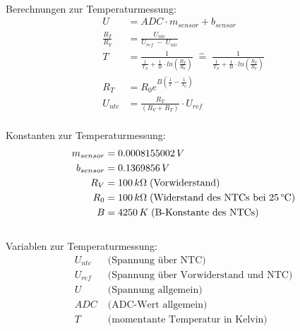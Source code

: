 \\
\begin{center}	
Berechnungen zur Temperaturmessung:
\begin{align}
	U &= ADC \cdot m_{sensor} + b_{sensor} \label{eq: U_ADC_sensor}\\
	\frac{R_T}{R_V} &= \frac{U_{ntc}}{U_{ref}\;-\;U_{ntc}} \label{eq: R_T}\\
	T &= \frac{1}{\frac{1}{T_N}+\frac{1}{B} \cdot ln(\frac{R_T}{R_0})}\; 
	\widehat{=}\; \frac{1}{\frac{1}{T_N}+\frac{1}{B} \cdot ln(\frac{R_T}{R_V})}  \label{eq: T}\\
	R_T &= R_0 e^{B\left(\frac{1}{T} - \frac{1}{T_0}\right)} \label{eq: R_T,2}\\
	U_{ntc} &= \frac{R_T}{(R_V + R_T)} \cdot U_{ref} \label{eq: U_ntc}
\end{align}
\\
Konstanten zur Temperaturmessung:
\begin{align*}
	m_{sensor} &= 0.0008155002\,V\\
	b_{sensor} &= 0.1369856\,V\\
	R_V &= 100\,k\Omega\; \text{(Vorwiderstand)}\\
	R_0 &= 100\,k\Omega\; \text{(Widerstand des NTCs bei 25\,°C)}\\
	B &= 4250\,K\; \text{(B-Konstante des NTCs)}
\end{align*}
\\Variablen zur Temperaturmessung:
\begin{align*}
 U_{ntc}\; &\text{(Spannung über NTC)}\\
 U_{ref}\; &\text{(Spannung über Vorwiderstand und NTC)}\\
 U\; &\text{(Spannung allgemein)}\\
 ADC\; &\text{(ADC-Wert allgemein)}\\
 T\; &\text{(momentante Temperatur in Kelvin)}\\
\end{align*}
\end{center}

